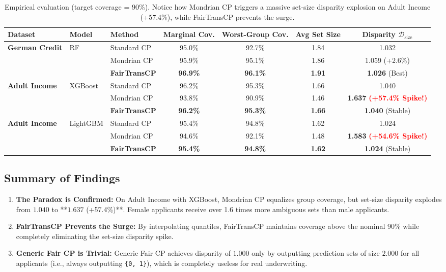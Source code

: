 \documentclass[11pt,a4paper]{article}
\begin{document}
\begin{table}[htbp]
\centering
\small
\begin{tabularx}{\textwidth}{@{}lllcccc@{}}
\toprule
\textbf{Dataset} & \textbf{Model} & \textbf{Method} & \textbf{Marginal Cov.} & \textbf{Worst-Group Cov.} & \textbf{Avg Set Size} & \textbf{Disparity $\mathcal{D}_{\text{size}}$} \\
\midrule
\textbf{German Credit} & RF & Standard CP & 95.0\% & 92.7\% & 1.84 & 1.032 \\
& & Mondrian CP & 95.9\% & 95.1\% & 1.86 & 1.059 \textcolor{borderorange}{(+2.6\%)} \\
& & \textbf{FairTransCP} & \textbf{96.9\%} & \textbf{96.1\%} & \textbf{1.91} & \textbf{1.026} \textcolor{bordergreen}{(Best)} \\
\midrule
\textbf{Adult Income} & XGBoost & Standard CP & 96.2\% & 95.3\% & 1.66 & 1.040 \\
& & Mondrian CP & 93.8\% & 90.9\% & 1.46 & \textbf{1.637} \textcolor{red}{\textbf{(+57.4\% Spike!)}} \\
& & \textbf{FairTransCP} & \textbf{96.2\%} & \textbf{95.3\%} & \textbf{1.66} & \textbf{1.040} \textcolor{bordergreen}{(Stable)} \\
\midrule
\textbf{Adult Income} & LightGBM & Standard CP & 95.4\% & 94.8\% & 1.62 & 1.024 \\
& & Mondrian CP & 94.6\% & 92.1\% & 1.48 & \textbf{1.583} \textcolor{red}{\textbf{(+54.6\% Spike!)}} \\
& & \textbf{FairTransCP} & \textbf{95.4\%} & \textbf{94.8\%} & \textbf{1.62} & \textbf{1.024} \textcolor{bordergreen}{(Stable)} \\
\bottomrule
\end{tabularx}
\caption{Empirical evaluation (target coverage = 90\%). Notice how Mondrian CP triggers a massive set-size disparity explosion on Adult Income (+57.4\%), while FairTransCP prevents the surge.}
\label{tab:results}
\end{table}

\subsection{Summary of Findings}
\begin{enumerate}[leftmargin=1.5em]
    \item \textbf{The Paradox is Confirmed:} On Adult Income with XGBoost, Mondrian CP equalizes group coverage, but set-size disparity explodes from $1.040$ to **$1.637$ (+57.4\%)**. Female applicants receive over 1.6 times more ambiguous sets than male applicants.
    \item \textbf{FairTransCP Prevents the Surge:} By interpolating quantiles, FairTransCP maintains coverage above the nominal 90\% while completely eliminating the set-size disparity spike.
    \item \textbf{Generic Fair CP is Trivial:} Generic Fair CP achieves disparity of $1.000$ only by outputting prediction sets of size $2.000$ for all applicants (i.e., always outputting \texttt{\{0, 1\}}), which is completely useless for real underwriting.
\end{enumerate}
\end{document}
